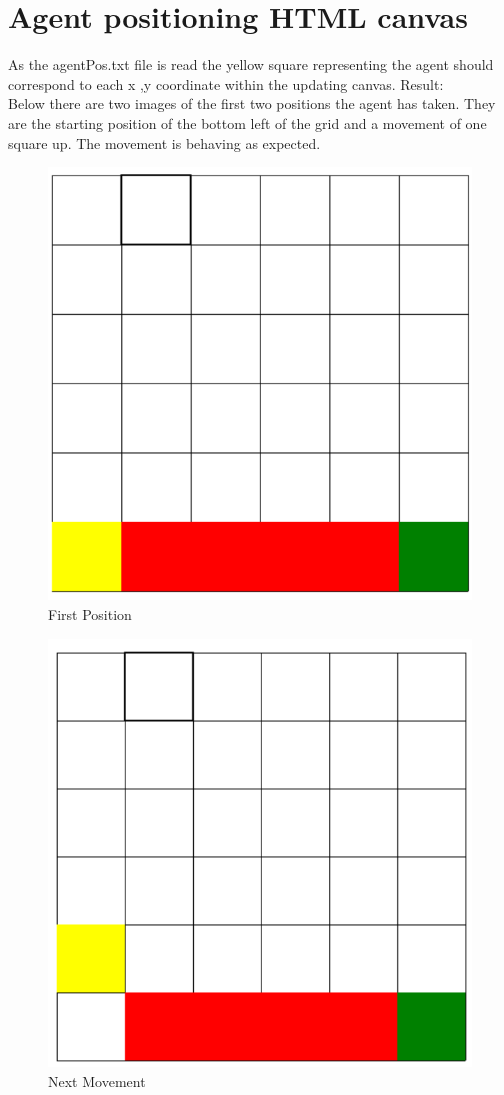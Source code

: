 \section{Agent positioning HTML canvas}
As the agentPos.txt file is read the yellow square representing the agent should correspond to each x ,y coordinate within the updating canvas.
Result:\\
Below there are two images of the first two positions the agent has taken. They are the starting position of the bottom left of the grid and a movement of one square up. The movement is behaving as expected.
\begin{figure}[H]
	\centering
	\includegraphics[width=0.7\linewidth]{img/position1}
	\caption{First Position}
	\label{fig:position1}
\end{figure}
\begin{figure}[H]
	\centering
	\includegraphics[width=0.7\linewidth]{img/positon2}
	\caption{Next Movement}
	\label{fig:positon2}
\end{figure}

